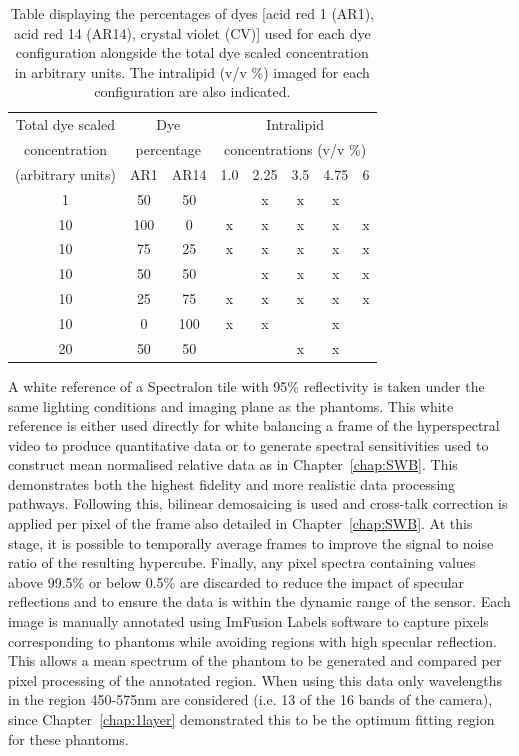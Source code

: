 \begin{table}[ht!]
    \centering
    \caption{Table displaying the percentages of dyes [acid red 1 (AR1), acid red 14 (AR14), crystal violet (CV)] used for each dye configuration alongside the total dye scaled concentration in arbitrary units. The intralipid (v/v \%) imaged for each configuration are also indicated.}
    \begin{tabular}{|c|c|c|c|c|c|c|c|}
        \hline
        Total dye scaled & \multicolumn{2}{|c|}{Dye } & \multicolumn{5}{c|}{Intralipid } \\
        concentration & \multicolumn{2}{|c|}{percentage} & \multicolumn{5}{c|}{concentrations (v/v \%)} \\
        (arbitrary units) & AR1 & AR14 & 1.0 & 2.25 & 3.5 & 4.75 & 6 \\
        \hline
        1 & 50 & 50 & & x & x & x & \\
        10 & 100 & 0 & x & x & x & x & x \\
        10 & 75 & 25 & x & x & x & x & x \\
        10 & 50 & 50 &  & x & x & x & x \\
        10 & 25 & 75 & x & x & x & x & x \\
        10 & 0 & 100 & x & x &  & x & \\
        20 & 50 & 50 &  & & x & x &  \\
        \hline
    \end{tabular}
    \label{tb:imagedphantoms}
\end{table}
A white reference of a Spectralon tile with 95\% reflectivity is taken under the same lighting conditions and imaging plane as the phantoms. This white reference is either used directly for white balancing a frame of the hyperspectral video to produce quantitative data or to generate spectral sensitivities used to construct mean normalised relative data as in Chapter~\ref{chap:SWB}. This demonstrates both the highest fidelity and more realistic data processing pathways. Following this, bilinear demosaicing is used and cross-talk correction is applied per pixel of the frame also detailed in Chapter~\ref{chap:SWB}. At this stage, it is possible to temporally average frames to improve the signal to noise ratio of the resulting hypercube. Finally, any pixel spectra containing values above 99.5\% or below 0.5\% are discarded to reduce the impact of specular reflections and to ensure the data is within the dynamic range of the sensor. 
Each image is manually annotated using ImFusion Labels software to capture pixels corresponding to phantoms while avoiding regions with high specular reflection. This allows a mean spectrum of the phantom to be generated and compared per pixel processing of the annotated region. When using this data only wavelengths in the region 450-575nm are considered (i.e. 13 of the 16 bands of the camera), since Chapter~\ref{chap:1layer} demonstrated this to be the optimum fitting region for these phantoms. 

